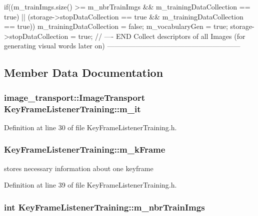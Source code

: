 \begin{DoxyCode}
{        if((m_trainImgs.size() >= m_nbrTrainImgs && m_trainingDataCollection ==
       true) || (storage->stopDataCollection == true && m_trainingDataCollection == 
      true))
        {
                m_trainingDataCollection = false;
                m_vocabularyGen = true;
                storage->stopDataCollection = true;
        }
        // ---- END Collect descriptors of all Images (for generating visual
       words later on) ---------------------------------------------------------
}
\end{DoxyCode}


\subsection{\-Member \-Data \-Documentation}
\hypertarget{classKeyFrameListenerTraining_a5063e03ecd884134bbffc0e32dfa71e2}{
\subsubsection[{m\-\_\-it}]{\setlength{\rightskip}{0pt plus 5cm}image\-\_\-transport\-::\-Image\-Transport {\bf \-Key\-Frame\-Listener\-Training\-::m\-\_\-it}}}\label{classKeyFrameListenerTraining_a5063e03ecd884134bbffc0e32dfa71e2}


\-Definition at line 30 of file \-Key\-Frame\-Listener\-Training.\-h.

\hypertarget{classKeyFrameListenerTraining_af9f9545cdabdc24d58237de03234c10f}{
\subsubsection[{m\-\_\-k\-Frame}]{ {\bf \-Key\-Frame\-Listener\-Training\-::m\-\_\-k\-Frame}}}\label{classKeyFrameListenerTraining_af9f9545cdabdc24d58237de03234c10f}


stores necessary information about one keyframe 



\-Definition at line 39 of file \-Key\-Frame\-Listener\-Training.\-h.

\hypertarget{classKeyFrameListenerTraining_aff6e3d535158a78b464c731d22af308e}{
\subsubsection[{m\-\_\-nbr\-Train\-Imgs}]{\setlength{\rightskip}{0pt plus 5cm}int {\bf \-Key\-Frame\-Listener\-Training\-::m\-\_\-nbr\-Train\-Imgs}}}\label{classKeyFrameListenerTraining_aff6e3d535158a78b464c731d22af308e}


